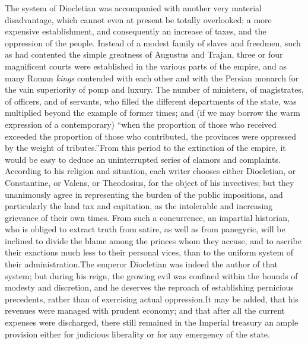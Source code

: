
The system of Diocletian was accompanied with another very
material disadvantage, which cannot even at present be totally
overlooked; a more expensive establishment, and consequently an
increase of taxes, and the oppression of the people. Instead of a
modest family of slaves and freedmen, such as had contented the
simple greatness of Augustus and Trajan, three or four
magnificent courts were established in the various parts of the
empire, and as many Roman \textit{kings} contended with each other and
with the Persian monarch for the vain superiority of pomp and
luxury. The number of ministers, of magistrates, of officers, and
of servants, who filled the different departments of the state,
was multiplied beyond the example of former times; and (if we may
borrow the warm expression of a contemporary) “when the
proportion of those who received exceeded the proportion of those
who contributed, the provinces were oppressed by the weight of
tributes.”\footnotemark[104] From this period to the extinction of the empire,
it would be easy to deduce an uninterrupted series of clamors and
complaints. According to his religion and situation, each writer
chooses either Diocletian, or Constantine, or Valens, or
Theodosius, for the object of his invectives; but they
unanimously agree in representing the burden of the public
impositions, and particularly the land tax and capitation, as the
intolerable and increasing grievance of their own times. From
such a concurrence, an impartial historian, who is obliged to
extract truth from satire, as well as from panegyric, will be
inclined to divide the blame among the princes whom they accuse,
and to ascribe their exactions much less to their personal vices,
than to the uniform system of their administration.\footnotemark[1041] The
emperor Diocletian was indeed the author of that system; but
during his reign, the growing evil was confined within the bounds
of modesty and discretion, and he deserves the reproach of
establishing pernicious precedents, rather than of exercising
actual oppression.\footnotemark[105] It may be added, that his revenues were
managed with prudent economy; and that after all the current
expenses were discharged, there still remained in the Imperial
treasury an ample provision either for judicious liberality or
for any emergency of the state.

